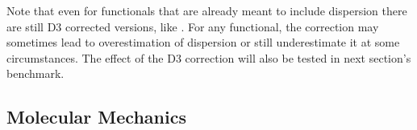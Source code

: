 Note that even for functionals that are already meant to include dispersion there
are still D3 corrected versions, like \bns\dt. For any functional, the correction
may sometimes lead to overestimation of dispersion or still underestimate it
at some circumstances. The effect of the D3 correction will also be tested in
next section's benchmark.

 

\subsection{Molecular Mechanics}
\label{Sec:Theo:MM}

\newcommand\EC{\enmat{V^{\te C}_{\al\be}}}
\newcommand\ralbe{\enmat{r_{\al\be}}}
\newcommand\qal{\enmat{q_{\al}}}
\newcommand\qbe{\enmat{q_{\be}}}

